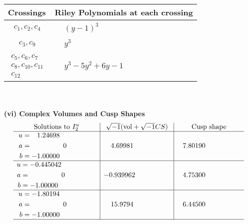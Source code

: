 \documentclass[1p]{elsarticle_modified}
\theoremstyle{definition}
\newcommand{\I}{\sqrt{-1}}
\begin{document}
\begin{tabular}{m{50pt}|m{274pt}}
Crossings & \hspace{64pt}Riley Polynomials at each crossing \\
\hline $$\begin{aligned}c_{1},c_{2},c_{4}\end{aligned}$$&$\begin{aligned}
&(y-1)^3
\end{aligned}$\\
\hline $$\begin{aligned}c_{3},c_{9}\end{aligned}$$&$\begin{aligned}
&y^3
\end{aligned}$\\
\hline $$\begin{aligned}c_{5},c_{6},c_{7}\\c_{8},c_{10},c_{11}\\c_{12}\end{aligned}$$&$\begin{aligned}
&y^3-5 y^2+6 y-1
\end{aligned}$\\
\hline
\end{tabular}\\~\\
\newpage\flushleft \textbf{(vi) Complex Volumes and Cusp Shapes}
$$\begin{array}{c|c|c}  
\text{Solutions to }I^u_{2}& \I (\text{vol} + \sqrt{-1}CS) & \text{Cusp shape}\\
 \hline 
\begin{aligned}
u &= \phantom{-}1.24698\phantom{ +0.000000I} \\
a &= \phantom{-0.000000 } 0 \\
b &= -1.00000\phantom{ +0.000000I}\end{aligned}
 & \phantom{-}4.69981\phantom{ +0.000000I} & \phantom{-}7.80190\phantom{ +0.000000I} \\ \hline\begin{aligned}
u &= -0.445042\phantom{ +0.000000I} \\
a &= \phantom{-0.000000 } 0 \\
b &= -1.00000\phantom{ +0.000000I}\end{aligned}
 & -0.939962\phantom{ +0.000000I} & \phantom{-}4.75300\phantom{ +0.000000I} \\ \hline\begin{aligned}
u &= -1.80194\phantom{ +0.000000I} \\
a &= \phantom{-0.000000 } 0 \\
b &= -1.00000\phantom{ +0.000000I}\end{aligned}
 & \phantom{-}15.9794\phantom{ +0.000000I} & \phantom{-}6.44500\phantom{ +0.000000I}\\
 \hline 
 \end{array}$$\newpage
\end{document}
